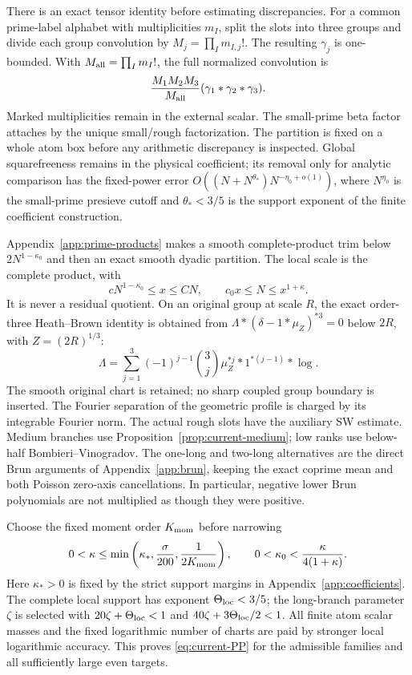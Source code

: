 There is an exact tensor identity before estimating discrepancies.
For a common prime-label alphabet with multiplicities $m_I$, split
the slots into three groups and divide each group convolution by
$M_j=\prod_I m_{I,j}!$.  The resulting $\gamma_j$ is one-bounded.
With $M_{\rm all}=\prod_I m_I!$, the full normalized convolution is
\[
 \frac{M_1M_2M_3}{M_{\rm all}}
                       (\gamma_1*\gamma_2*\gamma_3).
\]
Marked multiplicities remain in the external scalar.  The small-prime
beta factor attaches by the unique small/rough factorization.  The
partition is fixed on a whole atom box before any arithmetic
discrepancy is inspected.  Global squarefreeness remains in the
physical coefficient; its removal only for analytic comparison has
the fixed-power error
$O((N+N^{\theta_*})N^{-\eta_0+o(1)})$, where $N^{\eta_0}$ is
the small-prime presieve cutoff and $\theta_*<3/5$ is the support
exponent of the finite coefficient construction.

Appendix~\ref{app:prime-products} makes a smooth complete-product trim
below $2N^{1-\kappa_0}$ and then an exact smooth dyadic partition.
The local scale is the complete product, with
\[
 cN^{1-\kappa_0}\le x\le CN,\qquad
 c_0x\le N\le x^{1+\kappa}.
\]
It is never a residual quotient.  On an original group at scale $R$,
the exact order-three Heath--Brown identity is obtained from
$\Lambda*(\delta-1*\mu_Z)^{*3}=0$ below $2R$, with
$Z=(2R)^{1/3}$:
\begin{equation}
 \Lambda=\sum_{j=1}^3(-1)^{j-1}\binom3j
                 \mu_Z^{*j}*1^{*(j-1)}*\log.
 \label{eq:current-HB}
\end{equation}
The smooth original chart is retained; no sharp coupled group boundary
is inserted.  The Fourier separation of the geometric profile is
charged by its integrable Fourier norm.  The actual rough slots have
the auxiliary SW estimate.  Medium branches use
Proposition~\ref{prop:current-medium}; low ranks use below-half
Bombieri--Vinogradov.  The one-long and two-long alternatives are the
direct Brun arguments of Appendix~\ref{app:brun}, keeping the exact
coprime mean and both Poisson zero-axis cancellations.  In particular,
negative lower Brun polynomials are not multiplied as though they
were positive.

Choose the fixed moment order $K_{\rm mom}$ before narrowing
\[
 0<\kappa\le\min\left(\kappa_*,\frac{\sigma}{200},
                           \frac1{2K_{\rm mom}}\right),\qquad
 0<\kappa_0<\frac{\kappa}{4(1+\kappa)}.
\]
Here $\kappa_*>0$ is fixed by the strict support margins in
Appendix~\ref{app:coefficients}. The complete local support has exponent $\Theta_{\rm loc}<3/5$;
the long-branch parameter $\zeta$ is selected with
$20\zeta+\Theta_{\rm loc}<1$ and
$40\zeta+3\Theta_{\rm loc}/2<1$.  All finite atom scalar masses and
the fixed logarithmic number of charts are paid by stronger local
logarithmic accuracy.  This proves \eqref{eq:current-PP} for the
admissible families and all sufficiently large even targets.  

